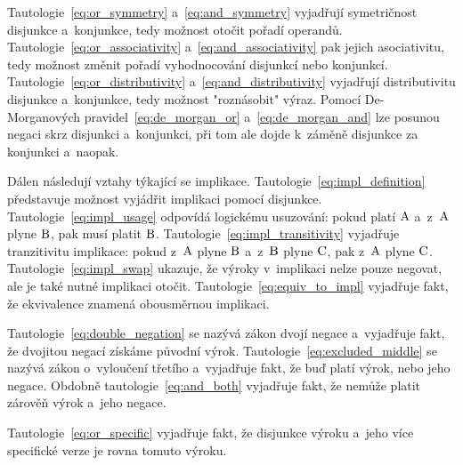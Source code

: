 \begin{fact}
\end{fact}

Tautologie~\eqref{eq:or_symmetry} a~\eqref{eq:and_symmetry} vyjadřují symetričnost disjunkce a~konjunkce, tedy možnost otočit pořadí operandů. Tautologie~\eqref{eq:or_associativity} a~\eqref{eq:and_associativity} pak jejich asociativitu, tedy možnost změnit pořadí vyhodnocování disjunkcí nebo konjunkcí. Tautologie~\eqref{eq:or_distributivity} a~\eqref{eq:and_distributivity} vyjadřují distributivitu disjunkce a~konjunkce, tedy možnost "roznásobit" výraz. Pomocí De-Morganových pravidel~\eqref{eq:de_morgan_or} a~\eqref{eq:de_morgan_and} lze posunou negaci skrz disjunkci a~konjunkci, při tom ale dojde k~záměně disjunkce za konjunkci a~naopak.

Dálen následují vztahy týkající se implikace. Tautologie~\eqref{eq:impl_definition} představuje možnost vyjádřit implikaci pomocí disjunkce. Tautologie~\eqref{eq:impl_usage} odpovídá logickému usuzování: pokud platí \(\mathrm{A}\) a~z~\(\mathrm{A}\) plyne \(\mathrm{B}\), pak musí platit \(\mathrm{B}\). Tautologie~\eqref{eq:impl_transitivity} vyjadřuje tranzitivitu implikace: pokud z~\(\mathrm{A}\) plyne \(\mathrm{B}\) a~z~\(\mathrm{B}\) plyne \(\mathrm{C}\), pak z~\(\mathrm{A}\) plyne \(\mathrm{C}\). Tautologie~\eqref{eq:impl_swap} ukazuje, že výroky v~implikaci nelze pouze negovat, ale je také nutné implikaci otočit. Tautologie~\eqref{eq:equiv_to_impl} vyjadřuje fakt, že ekvivalence znamená obousměrnou implikaci.

Tautologie~\eqref{eq:double_negation} se nazývá zákon dvojí negace a~vyjadřuje fakt, že dvojitou negací získáme původní výrok. Tautologie~\eqref{eq:excluded_middle} se nazývá zákon o~vyloučení třetího a~vyjadřuje fakt, že buď platí výrok, nebo jeho negace. Obdobně tautologie~\eqref{eq:and_both} vyjadřuje fakt, že nemůže platit zárověň výrok a~jeho negace.

Tautologie~\eqref{eq:or_specific} vyjadřuje fakt, že disjunkce výroku a~jeho více specifické verze je rovna tomuto výroku.

